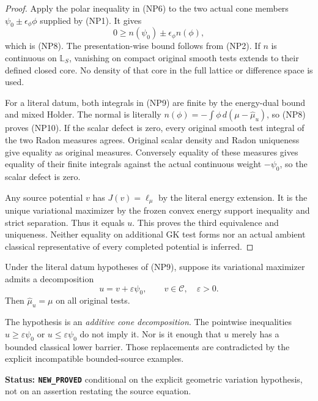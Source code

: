 \begin{proof}
Apply the polar inequality in \textup{(NP6)} to the
two actual cone members
$\psi_0\pm\epsilon_\phi\phi$ supplied by \textup{(NP1)}.
It gives
\[
               0\ge n(\psi_0)\pm\epsilon_\phi n(\phi),
\]
which is \textup{(NP8)}.  The presentation-wise bound
follows from \textup{(NP2)}.  If $n$ is continuous on
$\mathbb L_S$, vanishing on compact original smooth
tests extends to their defined closed core.  No density
of that core in the full lattice or difference space
is used.

For a literal datum, both integrals in \textup{(NP9)}
are finite by the energy-dual bound and mixed Holder.
The normal is literally
$n(\phi)=-\int\phi\,d(\mu-\widehat\mu_u)$,
so \textup{(NP8)} proves \textup{(NP10)}.
If the scalar defect is zero, every original smooth
test integral of the two Radon measures agrees.
Original scalar density and Radon uniqueness give
equality as original measures.  Conversely equality
of these measures gives equality of their finite
integrals against the actual continuous weight
$-\psi_0$, so the scalar defect is zero.

Any source potential $v$ has $J(v)=\ell_\mu$ by
the literal energy extension.  It is the unique
variational maximizer by the frozen convex energy
support inequality and strict separation.  Thus it
equals $u$.  This proves the third equivalence and
uniqueness.  Neither equality on additional GK test
forms nor an actual ambient classical representative
of every completed potential is inferred.
\end{proof}

\begin{corollary}
\label{cor:r12-additive-probe-source-criterion}
Under the literal datum hypotheses of \textup{(NP9)},
suppose its variational maximizer admits a decomposition
\[
                  u=v+\varepsilon\psi_0,
                  \qquad v\in\mathscr C,\quad\varepsilon>0.
 \tag{NP11}
\]
Then $\widehat\mu_u=\mu$ on all original tests.

The hypothesis is an \emph{additive cone decomposition}.
The pointwise inequalities $u\ge\varepsilon\psi_0$ or
$u\le\varepsilon\psi_0$ do not imply it.  Nor is it
enough that $u$ merely has a bounded classical lower
barrier.  Those replacements are contradicted by the
explicit incompatible bounded-source examples.
\end{corollary}

\noindent\textbf{Status: \texttt{NEW\_PROVED}} conditional
on the explicit geometric variation hypothesis, not on
an assertion restating the source equation.

